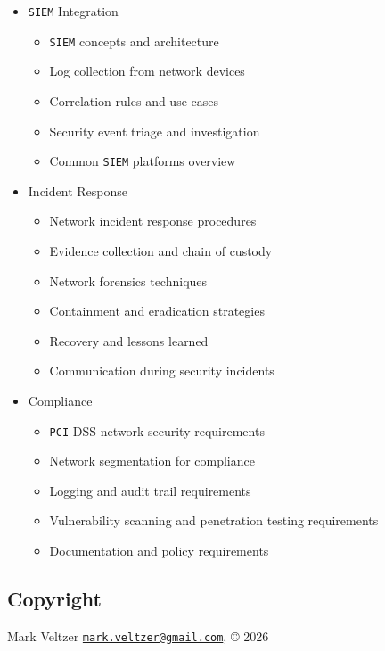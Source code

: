 \documentclass[
]{article}
\providecommand{\tightlist}{%
  \setlength{\itemsep}{0pt}\setlength{\parskip}{0pt}}
\begin{document}
\begin{itemize}
  \begin{itemize}
  \tightlist
  \item
    Packet capture with \texttt{tcpdump}
  \item
    Protocol analysis with \texttt{Wireshark}
  \item
    \texttt{Wireshark} filters and analysis techniques
  \item
    NetFlow and sFlow analysis
  \item
    Network baseline and anomaly detection
  \item
    Full packet capture vs metadata analysis
  \item
    Encrypted traffic analysis techniques
  \end{itemize}
\item
  \texttt{SIEM} Integration

  \begin{itemize}
  \tightlist
  \item
    \texttt{SIEM} concepts and architecture
  \item
    Log collection from network devices
  \item
    Correlation rules and use cases
  \item
    Security event triage and investigation
  \item
    Common \texttt{SIEM} platforms overview
  \end{itemize}
\item
  Incident Response

  \begin{itemize}
  \tightlist
  \item
    Network incident response procedures
  \item
    Evidence collection and chain of custody
  \item
    Network forensics techniques
  \item
    Containment and eradication strategies
  \item
    Recovery and lessons learned
  \item
    Communication during security incidents
  \end{itemize}
\item
  Compliance

  \begin{itemize}
  \tightlist
  \item
    \texttt{PCI}-DSS network security requirements
  \item
    Network segmentation for compliance
  \item
    Logging and audit trail requirements
  \item
    Vulnerability scanning and penetration testing requirements
  \item
    Documentation and policy requirements
  \end{itemize}
\end{itemize}

\subsection{Copyright}\label{copyright}

Mark Veltzer
\href{mailto:mark.veltzer@gmail.com}{\nolinkurl{mark.veltzer@gmail.com}},
© 2026
\end{document}
